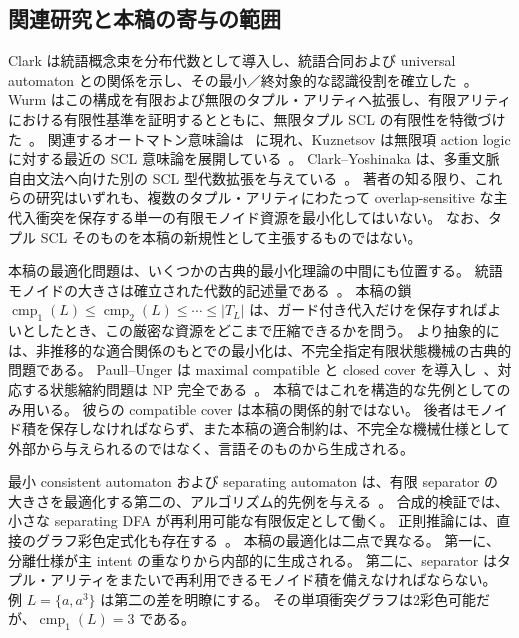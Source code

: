 \documentclass[10pt,a4paper]{ltjsarticle}
\theoremstyle{definition}
\theoremstyle{remark}
\newcommand{\cmp}{\operatorname{cmp}}
\begin{document}
\subsection{関連研究と本稿の寄与の範囲}

Clark は統語概念束を分布代数として導入し、統語合同および universal automaton との関係を示し、その最小／終対象的な認識役割を確立した~\cite{ClarkSCL}。
Wurm はこの構成を有限および無限のタプル・アリティへ拡張し、有限アリティにおける有限性基準を証明するとともに、無限タプル SCL の有限性を特徴づけた~\cite{WurmSCLTuples}。
関連するオートマトン意味論は~\cite{WurmJLLI2017} に現れ、Kuznetsov は無限項 action logic に対する最近の SCL 意味論を展開している~\cite{Kuznetsov2026}。
Clark--Yoshinaka は、多重文脈自由文法へ向けた別の SCL 型代数拡張を与えている~\cite{ClarkYoshinaka2014}。
著者の知る限り、これらの研究はいずれも、複数のタプル・アリティにわたって overlap-sensitive な主代入衝突を保存する単一の有限モノイド資源を最小化してはいない。
なお、タプル SCL そのものを本稿の新規性として主張するものではない。

本稿の最適化問題は、いくつかの古典的最小化理論の中間にも位置する。
統語モノイドの大きさは確立された代数的記述量である~\cite{HolzerKonig2004}。
本稿の鎖
$\cmp_1(L)\le\cmp_2(L)\le\cdots\le |T_L|$
は、ガード付き代入だけを保存すればよいとしたとき、この厳密な資源をどこまで圧縮できるかを問う。
より抽象的には、非推移的な適合関係のもとでの最小化は、不完全指定有限状態機械の古典的問題である。
Paull--Unger は maximal compatible と closed cover を導入し~\cite{PaullUnger1959}、対応する状態縮約問題は NP 完全である~\cite{Pfleeger1973}。
本稿ではこれを構造的な先例としてのみ用いる。
彼らの compatible cover は本稿の関係的射ではない。
後者はモノイド積を保存しなければならず、また本稿の適合制約は、不完全な機械仕様として外部から与えられるのではなく、言語そのものから生成される。

最小 consistent automaton および separating automaton は、有限 separator の大きさを最適化する第二の、アルゴリズム的先例を与える~\cite{PittWarmuth1993,ChenFarzanClarkeTsayWang2009,VazquezPargaGarciaLopez2016,LaumenSnelVaandrager2026}。
合成的検証では、小さな separating DFA が再利用可能な有限仮定として働く。
正則推論には、直接のグラフ彩色定式化も存在する~\cite{CostaFlorencioVerwer2014}。
本稿の最適化は二点で異なる。
第一に、分離仕様が主 intent の重なりから内部的に生成される。
第二に、separator はタプル・アリティをまたいで再利用できるモノイド積を備えなければならない。
例 $L=\{a,a^3\}$ は第二の差を明瞭にする。
その単項衝突グラフは2彩色可能だが、$\cmp_1(L)=3$ である。
\end{document}
